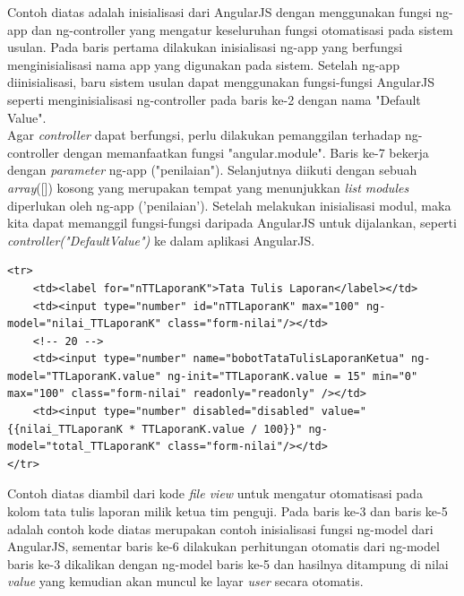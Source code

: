 	Contoh diatas adalah inisialisasi dari AngularJS dengan menggunakan fungsi ng-app dan ng-controller yang mengatur keseluruhan fungsi otomatisasi pada sistem usulan. Pada baris pertama dilakukan inisialisasi ng-app yang berfungsi menginisialisasi nama app yang digunakan pada sistem. Setelah ng-app diinisialisasi, baru sistem usulan dapat menggunakan fungsi-fungsi AngularJS seperti menginisialisasi ng-controller pada baris ke-2 dengan nama "Default Value".\\
	Agar \textit{controller} dapat berfungsi, perlu dilakukan pemanggilan terhadap ng-controller dengan memanfaatkan fungsi "angular.module". Baris ke-7 bekerja dengan \textit{parameter} ng-app ("penilaian"). Selanjutnya diikuti dengan sebuah \textit{array}([]) kosong yang merupakan tempat yang menunjukkan \textit{list modules} diperlukan oleh ng-app ('penilaian'). Setelah melakukan inisialisasi modul, maka kita dapat memanggil fungsi-fungsi daripada AngularJS untuk dijalankan, seperti \textit{controller("DefaultValue")} ke dalam aplikasi AngularJS.
	
\begin{lstlisting}
<tr>
	<td><label for="nTTLaporanK">Tata Tulis Laporan</label></td>
	<td><input type="number" id="nTTLaporanK" max="100" ng-model="nilai_TTLaporanK" class="form-nilai"/></td>
	<!-- 20 -->
	<td><input type="number" name="bobotTataTulisLaporanKetua" ng-model="TTLaporanK.value" ng-init="TTLaporanK.value = 15" min="0" max="100" class="form-nilai" readonly="readonly" /></td>
	<td><input type="number" disabled="disabled" value="{{nilai_TTLaporanK * TTLaporanK.value / 100}}" ng-model="total_TTLaporanK" class="form-nilai"/></td>
</tr>
\end{lstlisting}
	
	Contoh diatas diambil dari kode \textit{file view} untuk mengatur otomatisasi pada kolom tata tulis laporan milik ketua tim penguji. Pada baris ke-3 dan baris ke-5 adalah contoh kode diatas merupakan contoh inisialisasi fungsi ng-model dari AngularJS, sementar baris ke-6 dilakukan perhitungan otomatis dari ng-model baris ke-3 dikalikan dengan ng-model baris ke-5 dan hasilnya ditampung di nilai \textit{value} yang kemudian akan muncul ke layar \textit{user} secara otomatis.
	
